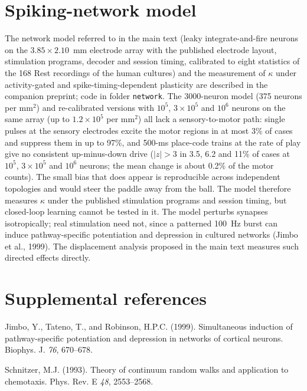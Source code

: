 \documentclass[11pt]{article}
\begin{document}
\section*{Spiking-network model}
The network model referred to in the main text (leaky integrate-and-fire neurons on the $3.85\times2.10$~mm electrode array with the published electrode layout, stimulation programs, decoder and session timing, calibrated to eight statistics of the 168 Rest recordings of the human cultures) and the measurement of $\kappa$ under activity-gated and spike-timing-dependent plasticity are described in the companion preprint; code in folder \texttt{network}. The 3000-neuron model (375 neurons per mm$^2$) and re-calibrated versions with $10^5$, $3\times10^5$ and $10^6$ neurons on the same array (up to $1.2\times10^5$ per mm$^2$) all lack a sensory-to-motor path: single pulses at the sensory electrodes excite the motor regions in at most 3\% of cases and suppress them in up to 97\%, and 500-ms place-code trains at the rate of play give no consistent up-minus-down drive ($|z|>3$ in 3.5, 6.2 and 11\% of cases at $10^5$, $3\times10^5$ and $10^6$ neurons; the mean change is about 0.2\% of the motor counts). The small bias that does appear is reproducible across independent topologies and would steer the paddle away from the ball. The model therefore measures $\kappa$ under the published stimulation programs and session timing, but closed-loop learning cannot be tested in it. The model perturbs synapses isotropically; real stimulation need not, since a patterned 100~Hz burst can induce pathway-specific potentiation and depression in cultured networks (Jimbo et al., 1999). The displacement analysis proposed in the main text measures such directed effects directly.

\section*{Supplemental references}
Jimbo, Y., Tateno, T., and Robinson, H.P.C. (1999). Simultaneous induction of pathway-specific potentiation and depression in networks of cortical neurons. Biophys. J. \emph{76}, 670--678.\par
Schnitzer, M.J. (1993). Theory of continuum random walks and application to chemotaxis. Phys. Rev. E \emph{48}, 2553--2568.\par
\end{document}
